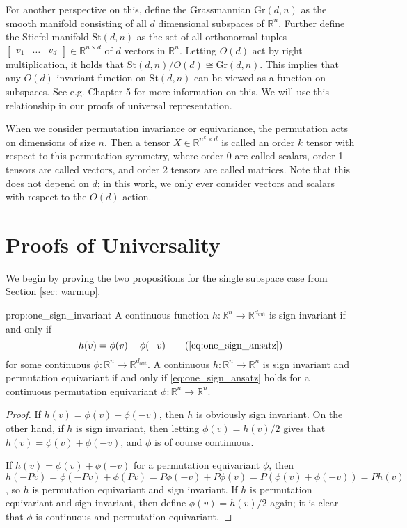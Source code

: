 \documentclass{article} \usepackage{iclr2023_conference,times}
\newcommand{\RR}{\mathbb R}
\newcommand{\mrm}[1]{\mathrm{#1}}
\newcommand{\st}{\mrm{St}}
\newcommand{\gr}{\mrm{Gr}}
\newcommand{\dout}{d_{\mrm{out}}}
\begin{document}
For another perspective on this, define the Grassmannian $\gr(d,n)$ as the smooth manifold consisting of all $d$ dimensional subspaces of $\RR^n$. Further define the Stiefel manifold $\st(d,n)$ as the set of all orthonormal tuples $\begin{bmatrix}v_1 & \ldots & v_d\end{bmatrix} \in \RR^{n \times d}$ of $d$ vectors in $\RR^n$. Letting $O(d)$ act by right multiplication, it holds that $\st(d,n) / O(d) \cong \gr(d,n)$. This implies that any $O(d)$ invariant function on $\st(d,n)$ can be viewed as a function on subspaces. See e.g. \cite{gallier2020differential} Chapter 5 for more information on this. We will use this relationship in our proofs of universal representation.


When we consider permutation invariance or equivariance, the permutation acts on dimensions of size $n$. Then a tensor $X \in \RR^{n^k \times d}$ is called an order $k$ tensor with respect to this permutation symmetry, where order 0 are called scalars, order 1 tensors are called vectors, and order 2 tensors are called matrices. Note that this does not depend on $d$; in this work, we only ever consider vectors and scalars with respect to the $O(d)$ action.


\section{Proofs of Universality}


We begin by proving the two propositions for the single subspace case from Section \ref{sec: warmup}.

\begin{repproposition}{prop:one_sign_invariant}
    A continuous function $h: \RR^n \to \RR^{\dout}$ is sign invariant if and only if
    \begin{equation}
     h(v) = \phi(v) + \phi(-v)   \tag{\ref{eq:one_sign_ansatz}}
    \end{equation}
    for some continuous $\phi: \RR^n \to \RR^{\dout}$. A continuous $h: \RR^n \to \RR^n$ is sign invariant and permutation equivariant if and only if \eqref{eq:one_sign_ansatz} holds for a continuous permutation equivariant $\phi: \RR^n \to \RR^n$.
\end{repproposition}



\begin{proof}
    If $h(v) = \phi(v) + \phi(-v)$, then $h$ is obviously sign invariant. On the other hand, if $h$ is sign invariant, then letting $\phi(v) = h(v)/2$ gives that $h(v) = \phi(v) + \phi(-v)$, and $\phi$ is of course continuous.

    If $h(v) = \phi(v) + \phi(-v)$ for a permutation equivariant $\phi$, then $h(-Pv) = \phi(-Pv) + \phi(Pv) = P\phi(-v) + P\phi(v) = P(\phi(v) + \phi(-v)) = Ph(v)$, so $h$ is permutation equivariant and sign invariant. If $h$ is permutation equivariant and sign invariant, then define $\phi(v) = h(v)/2$ again; it is clear that $\phi$ is continuous and permutation equivariant.
\end{proof}
\end{document}
